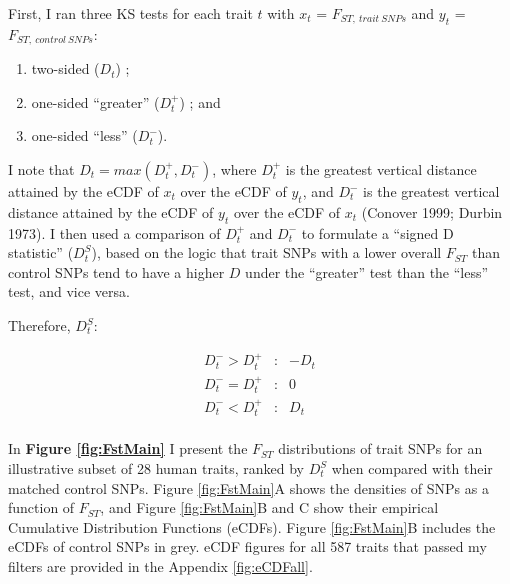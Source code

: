 \documentclass[
]{book}
\begin{document}
First, I ran three KS tests for each trait \(t\) with \(x_t\) = \(F_{ST,~trait~SNPs}\) and \(y_t\) = \(F_{ST,~ control~SNPs}\):

\begin{enumerate}
\def\labelenumi{\arabic{enumi}.}
\item
  two-sided (\(D_t\)) ;
\item
  one-sided ``greater'' (\(D_t^+\)) ; and
\item
  one-sided ``less'' (\(D_t^-\)).
\end{enumerate}

I note that \(D_{t} = max(D_t^+, D_t^-)\), where \(D_t^+\) is the greatest vertical distance attained by the eCDF of \(x_t\) over the eCDF of \(y_t\), and \(D_t^-\) is the greatest vertical distance attained by the eCDF of \(y_t\) over the eCDF of \(x_t\) (Conover 1999; Durbin 1973). I then used a comparison of \(D_t^+\) and \(D_t^-\) to formulate a ``signed D statistic'' (\(D_t^S\)), based on the logic that trait SNPs with a lower overall \(F_{ST}\) than control SNPs tend to have a higher \(D\) under the ``greater'' test than the ``less'' test, and vice versa.

Therefore, \({D_t^S}\):

\[
\begin{aligned}
D_t^- > D_t^+ &: &-D_t \\
D_t^- = D_t^+ &: &0 \\
D_t^- < D_t^+ &: &D_t \\
\end{aligned}
\]

In \textbf{Figure \ref{fig:FstMain}} I present the \(F_{ST}\) distributions of trait SNPs for an illustrative subset of 28 human traits, ranked by \({D_t^S}\) when compared with their matched control SNPs. Figure \ref{fig:FstMain}A shows the densities of SNPs as a function of \(F_{ST}\), and Figure \ref{fig:FstMain}B and C show their empirical Cumulative Distribution Functions (eCDFs). Figure \ref{fig:FstMain}B includes the eCDFs of control SNPs in grey. eCDF figures for all 587 traits that passed my filters are provided in the Appendix \ref{fig:eCDFall}.
\end{document}
